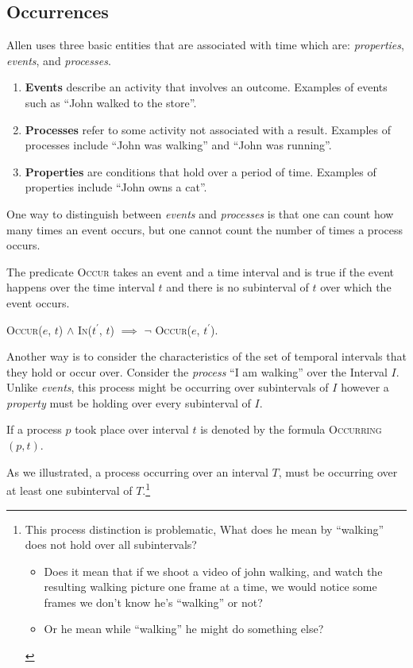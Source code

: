 \subsection{Occurrences}
Allen uses three basic entities that are associated with time which are: \textit{properties}, \textit{events}, and \textit{processes}.
\begin{enumerate}
	\item \textbf{Events} describe an activity that involves an outcome. Examples of events such as ``John walked to the store''.

	\item \textbf{Processes} refer to some activity not associated with a result. Examples of processes include ``John was walking'' and ``John was running''.

	\item \textbf{Properties} are conditions that hold over a period of time. Examples of properties include ``John owns a cat''.
\end{enumerate}
One way to distinguish between \textit{events} and \textit{processes} is that one can count how many times an event occurs, but one cannot count
the number of times a process occurs.


The predicate \textsc{Occur} takes an event and a time interval and is true if the event happens over the time interval $t$ and there is no subinterval of $t$
over which the event occurs.

\begin{center}
	\textsc{Occur}($e$, $t$) $\land$ \textsc{In}($t^\prime$, $t$) $\implies$ \(\lnot\) \textsc{Occur}($e$, $t^\prime$).
\end{center}

Another way is to consider the characteristics of the set of temporal intervals that they hold or occur over.
Consider the \textit{process} ``I am walking'' over the Interval $I$. Unlike \textit{events}, this process might be occurring over subintervals of $I$ however a \textit{property} must be holding over every subinterval of $I$.


If a process $p$ took place over interval $t$ is denoted by the formula \textsc{Occurring}$(p,t)$.


As we illustrated, a process occurring over an interval $T$, must be occurring over at least one subinterval of $T$.\footnote{This process distinction is problematic, What does he mean by ``walking'' does not hold over all subintervals?
  \begin{itemize}
    \item 
  Does it mean that if we shoot a video of john walking, and watch the resulting walking picture one frame at a time, we would notice some frames we don't know he's ``walking'' or not?
\item Or he mean while ``walking'' he might do something else?
  \end{itemize}
}

